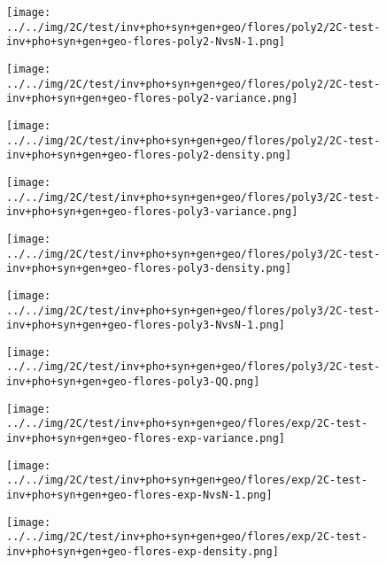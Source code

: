 \begin{figure}[H]
\centering	\texttt{[image: ../../img/2C/test/inv+pho+syn+gen+geo/flores/poly2/2C-test-inv+pho+syn+gen+geo-flores-poly2-NvsN-1.png]}
\end{figure}
\begin{figure}[H]
\centering	\texttt{[image: ../../img/2C/test/inv+pho+syn+gen+geo/flores/poly2/2C-test-inv+pho+syn+gen+geo-flores-poly2-variance.png]}
\end{figure}
\begin{figure}[H]
\centering	\texttt{[image: ../../img/2C/test/inv+pho+syn+gen+geo/flores/poly2/2C-test-inv+pho+syn+gen+geo-flores-poly2-density.png]}
\end{figure}
\begin{figure}[H]
\centering	\texttt{[image: ../../img/2C/test/inv+pho+syn+gen+geo/flores/poly3/2C-test-inv+pho+syn+gen+geo-flores-poly3-variance.png]}
\end{figure}
\begin{figure}[H]
\centering	\texttt{[image: ../../img/2C/test/inv+pho+syn+gen+geo/flores/poly3/2C-test-inv+pho+syn+gen+geo-flores-poly3-density.png]}
\end{figure}
\begin{figure}[H]
\centering	\texttt{[image: ../../img/2C/test/inv+pho+syn+gen+geo/flores/poly3/2C-test-inv+pho+syn+gen+geo-flores-poly3-NvsN-1.png]}
\end{figure}
\begin{figure}[H]
\centering	\texttt{[image: ../../img/2C/test/inv+pho+syn+gen+geo/flores/poly3/2C-test-inv+pho+syn+gen+geo-flores-poly3-QQ.png]}
\end{figure}
\begin{figure}[H]
\centering	\texttt{[image: ../../img/2C/test/inv+pho+syn+gen+geo/flores/exp/2C-test-inv+pho+syn+gen+geo-flores-exp-variance.png]}
\end{figure}
\begin{figure}[H]
\centering	\texttt{[image: ../../img/2C/test/inv+pho+syn+gen+geo/flores/exp/2C-test-inv+pho+syn+gen+geo-flores-exp-NvsN-1.png]}
\end{figure}
\begin{figure}[H]
\centering	\texttt{[image: ../../img/2C/test/inv+pho+syn+gen+geo/flores/exp/2C-test-inv+pho+syn+gen+geo-flores-exp-density.png]}
\end{figure}

